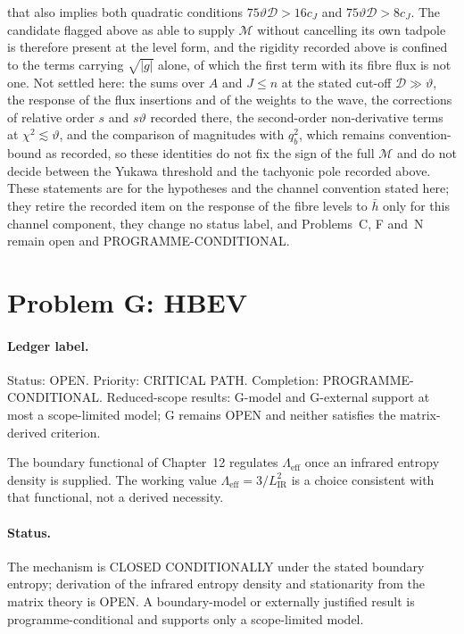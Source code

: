 that also implies both quadratic conditions \(75\vartheta\mathcal D>16c_J\) and \(75\vartheta\mathcal D>8c_J\). The candidate flagged above as able to supply \(\mathcal M\) without cancelling its own tadpole is therefore present at the level form, and the rigidity recorded above is confined to the terms carrying \(\sqrt{|g|}\) alone, of which the first term with its fibre flux is not one. Not settled here: the sums over \(A\) and \(J\le n\) at the stated cut-off \(\mathcal D\gg\vartheta\), the response of the flux insertions and of the weights to the wave, the corrections of relative order \(s\) and \(s\vartheta\) recorded there, the second-order non-derivative terms at \(\chi^2\lesssim\vartheta\), and the comparison of magnitudes with \(q_b^2\), which remains convention-bound as recorded, so these identities do not fix the sign of the full \(\mathcal M\) and do not decide between the Yukawa threshold and the tachyonic pole recorded above. These statements are for the hypotheses and the channel convention stated here; they retire the recorded item on the response of the fibre levels to \(\bar h\) only for this channel component, they change no status label, and Problems~C, F and~N remain open and PROGRAMME-CONDITIONAL.

\section{Problem G: HBEV}
\label{sec:status-G}

\paragraph{Ledger label.}
Status: OPEN. Priority: CRITICAL PATH. Completion:
PROGRAMME-CONDITIONAL. Reduced-scope results: G-model and
G-external support at most a scope-limited model; G remains OPEN
and neither satisfies the matrix-derived criterion.

The boundary functional of Chapter~12 regulates \(\Lambda_{\mathrm{eff}}\)
once an infrared entropy density is supplied. The working value
\(\Lambda_{\mathrm{eff}}=3/L_{\mathrm{IR}}^2\) is a choice consistent with
that functional, not a derived necessity.

\paragraph{Status.}
The mechanism is CLOSED CONDITIONALLY under the stated boundary
entropy; derivation of the infrared entropy density and stationarity
from the matrix theory is OPEN. A boundary-model or externally
justified result is programme-conditional and supports only a
scope-limited model.

